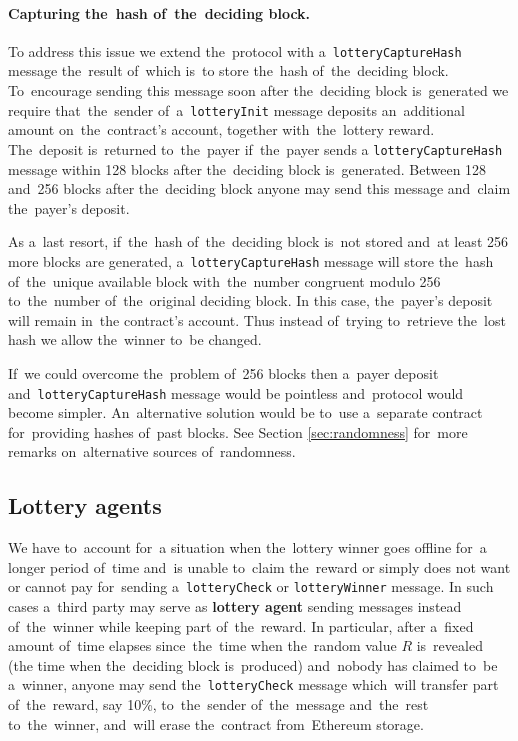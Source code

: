 \documentclass[a4paper]{article}
\begin{document}
    \paragraph{Capturing the~hash of~the~deciding block.}

    To address this issue we extend the~protocol with a~\texttt{lotteryCaptureHash} message the~result of~which is~to
    store the~hash of~the~deciding block. To~encourage sending this message soon after the~deciding block is~generated
    we require that~the~sender of~a~\texttt{lotteryInit} message deposits an~additional amount on~the~contract's
    account, together with~the~lottery reward. The~deposit is~returned to~the~payer if~the~payer sends a
    \texttt{lotteryCaptureHash} message within 128 blocks after the~deciding block is~generated.
    Between 128 and~256 blocks after the~deciding block anyone may send this message and~claim the~payer's deposit.

    As a~last resort, if~the~hash of~the~deciding block is~not stored and~at least 256 more blocks are generated,
    a~\texttt{lotteryCaptureHash} message will store the~hash of~the~unique available block with~the~number congruent
    modulo 256 to~the~number of~the~original deciding block. In this case, the~payer's deposit will remain in~the
    contract's account. Thus instead of~trying to~retrieve the~lost hash we allow the~winner to~be changed.

    If~we could overcome the~problem of~256 blocks then a~payer deposit and~\texttt{lotteryCaptureHash} message would
    be pointless and~protocol would become simpler. An~alternative solution would be to~use a~separate contract
    for~providing hashes of~past blocks. See Section \ref{sec:randomness} for~more remarks on~alternative sources
    of~randomness.
\subsection{Lottery agents}
    We have to~account for~a situation when the~lottery winner goes offline for~a longer period of~time and~is
    unable to~claim the~reward or simply does not want or cannot pay for~sending a~\texttt{lotteryCheck} or
    \texttt{lotteryWinner} message. In such cases a~third party may serve as \textbf{lottery agent} sending messages
    instead of~the~winner while keeping part of~the~reward. In particular, after a~fixed amount of~time elapses
    since~the~time when the~random value $R$ is~revealed (the time when the~deciding block is~produced) and~nobody has
    claimed to~be a~winner, anyone may send the~\texttt{lotteryCheck} message which~will transfer part of~the~reward,
    say 10\%, to~the~sender of~the~message and~the~rest to~the~winner, and~will erase the~contract from~Ethereum
    storage.
\end{document}
